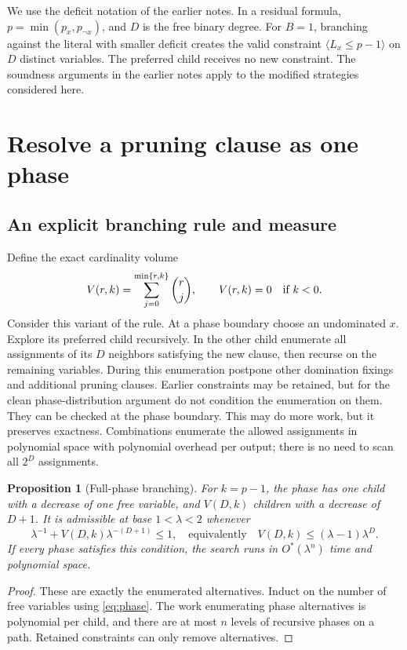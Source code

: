 \documentclass[11pt,a4paper]{article}
\newtheorem{proposition}{Proposition}
\theoremstyle{remark}
\newcommand{\Ostar}{O^{*}}
\begin{document}
We use the deficit notation of the earlier notes. In a residual formula,
$p=\min(p_x,p_{\neg x})$, and $D$ is the free binary degree. For $B=1$,
branching against the literal with smaller deficit creates the valid
constraint $\langle L_x\le p-1\rangle$ on $D$ distinct variables. The preferred
child receives no new constraint. The soundness arguments in the earlier
notes apply to the modified strategies considered here.

\section{Resolve a pruning clause as one phase}

\subsection{An explicit branching rule and measure}

Define the exact cardinality volume
\[
 V(r,k)=\sum_{j=0}^{\min\{r,k\}}\binom rj,
 \qquad V(r,k)=0\quad\hbox{if }k<0.
\]
Consider this variant of the rule. At a phase boundary choose an undominated
$x$. Explore its preferred child recursively. In the other child enumerate
all assignments of its $D$ neighbors satisfying the new clause, then recurse
on the remaining variables. During this enumeration postpone other
domination fixings and additional pruning clauses. Earlier constraints may
be retained, but for the clean phase-distribution argument do not condition
the enumeration on them. They can be checked at the phase boundary.
This may do more work, but it preserves exactness. Combinations enumerate the
allowed assignments in polynomial space with polynomial overhead per output;
there is no need to scan all $2^D$ assignments.

\begin{proposition}[Full-phase branching]
For $k=p-1$, the phase has one child with a decrease of one free variable,
and $V(D,k)$ children with a decrease of $D+1$. It is admissible at base
$1<\lambda<2$ whenever
\begin{equation}
 \lambda^{-1}+V(D,k)\lambda^{-(D+1)}\le1,
 \quad\text{equivalently}\quad
 V(D,k)\le(\lambda-1)\lambda^D.                 \label{eq:phase}
\end{equation}
If every phase satisfies this condition, the search runs in
$\Ostar(\lambda^n)$ time and polynomial space.
\end{proposition}
\begin{proof}
These are exactly the enumerated alternatives. Induct on the number of free
variables using \eqref{eq:phase}. The work enumerating phase alternatives
is polynomial per child, and there are at most $n$ levels of recursive
phases on a path. Retained constraints can only remove alternatives.
\end{proof}
\end{document}
